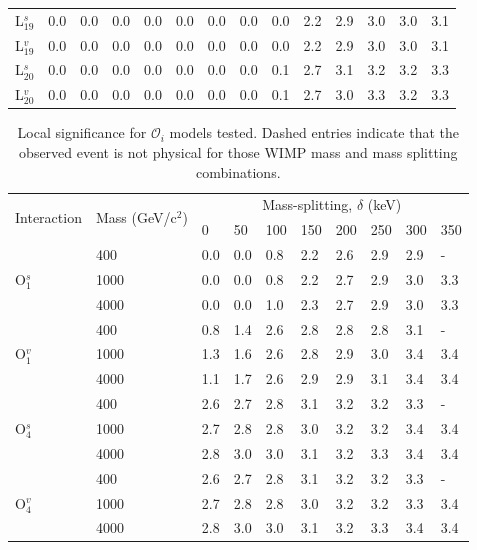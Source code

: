 \begin{table}[ht]
\begin{tabular}{l|lllllllllllll}
    L$^s_{19}$ & 0.0 & 0.0 & 0.0 & 0.0 & 0.0 & 0.0 & 0.0 & 0.0 & 2.2 & 2.9 & 3.0 & 3.0 & 3.1 \\
    L$^v_{19}$ & 0.0 & 0.0 & 0.0 & 0.0 & 0.0 & 0.0 & 0.0 & 0.0 & 2.2 & 2.9 & 3.0 & 3.0 & 3.1 \\
    L$^s_{20}$ & 0.0 & 0.0 & 0.0 & 0.0 & 0.0 & 0.0 & 0.0 & 0.1 & 2.7 & 3.1 & 3.2 & 3.2 & 3.3 \\
    L$^v_{20}$ & 0.0 & 0.0 & 0.0 & 0.0 & 0.0 & 0.0 & 0.0 & 0.1 & 2.7 & 3.0 & 3.3 & 3.2 & 3.3 \\
    \hline
    \hline
    \end{tabular}
    \label{tab:lagrangian_significance}
\end{table}

\begin{table}[ht]
    \centering
    \caption{Local significance for $\mathcal{O}_i$ models tested.
    Dashed entries indicate that the observed event is not physical for those WIMP mass and mass splitting combinations.}
    \begin{tabular}{l|l|llllllll}
    \hline
    \multirow{2}{*}{Interaction} & \multirow{2}{*}{Mass (GeV/c$^2$)} & \multicolumn{8}{c}{Mass-splitting, $\delta$ (keV)} \\
                             &      & 0   & 50 & 100  & 150 & 200 & 250 & 300 & 350 \\
    \hline
    \multirow{3}{*}{O$^s_1$} 
    & 400  & 0.0 & 0.0  & 0.8  & 2.2  & 2.6   & 2.9 & 2.9   & -  \\
    & 1000 & 0.0 & 0.0  & 0.8  & 2.2  & 2.7   & 2.9 & 3.0 & 3.3  \\
    & 4000 & 0.0 & 0.0  & 1.0  & 2.3  & 2.7   & 2.9 & 3.0 & 3.3  \\ \hline
    \multirow{3}{*}{O$^v_1$} 
    & 400  & 0.8 & 1.4 & 2.6 & 2.8 & 2.8 & 2.8 & 3.1 & - \\
    & 1000 & 1.3 & 1.6 & 2.6 & 2.8 & 2.9 & 3.0 & 3.4 & 3.4 \\
    & 4000 & 1.1 & 1.7 & 2.6 & 2.9 & 2.9 & 3.1 & 3.4 & 3.4 \\ \hline
    \multirow{3}{*}{O$^s_4$} 
    & 400  & 2.6 & 2.7 & 2.8 & 3.1 & 3.2 & 3.2 & 3.3 & - \\
    & 1000 & 2.7 & 2.8 & 2.8 & 3.0 & 3.2 & 3.2 & 3.4 & 3.4 \\
    & 4000 & 2.8 & 3.0 & 3.0 & 3.1 & 3.2 & 3.3 & 3.4 & 3.4 \\ \hline
    \multirow{3}{*}{O$^v_4$} 
    & 400  & 2.6 & 2.7 & 2.8 & 3.1 & 3.2 & 3.2 & 3.3 & - \\
    & 1000 & 2.7 & 2.8 & 2.8 & 3.0 & 3.2 & 3.2 & 3.3 & 3.4 \\
    & 4000 & 2.8 & 3.0 & 3.0 & 3.1 & 3.2 & 3.3 & 3.4 & 3.4 \\
    \hline
    \hline
    \end{tabular}
    \label{tab:operator_significance}
\end{table}



